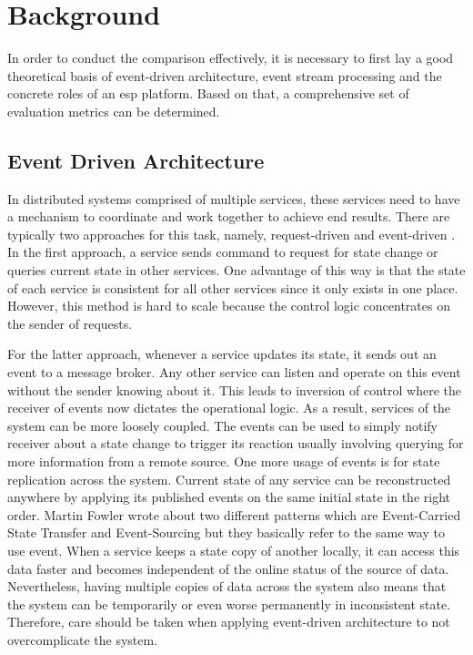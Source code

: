 \chapter{Background} \label{chap:background}
In order to conduct the comparison effectively, it is necessary to first lay a good theoretical basis of event-driven architecture, event stream processing and the concrete roles of an \acrlong{esp} platform. Based on that, a comprehensive set of evaluation metrics can be determined.
\section{Event Driven Architecture}
In distributed systems comprised of multiple services, these services need to have a mechanism to coordinate and work together to achieve end results. There are typically two approaches for this task, namely, request-driven and event-driven \cite{stopford2018designingeventdriven}. In the first approach, a service sends command to request for state change or queries current state in other services. One advantage of this way is that the state of each service is consistent for all other services since it only exists in one place. However, this method is hard to scale because the control logic concentrates on the sender of requests.

For the latter approach, whenever a service updates its state, it sends out an event to a message broker. Any other service can listen and operate on this event without the sender knowing about it. This leads to inversion of control where the receiver of events now dictates the operational logic. As a result, services of the system can be more loosely coupled. The events can be used to simply notify receiver about a state change to trigger its reaction usually involving querying for more information from a remote source. One more usage of events is for state replication across the system. Current state of any service can be reconstructed anywhere by applying its published events on the same initial state in the right order. Martin Fowler wrote about two different patterns which are Event-Carried State Transfer and Event-Sourcing \cite{martinfowlereventdriven} but they basically refer to the same way to use event. When a service keeps a state copy of another locally, it can access this data faster and becomes independent of the online status of the source of data. Nevertheless, having multiple copies of data across the system also means that the system can be temporarily or even worse permanently in inconsistent state. Therefore, care should be taken when applying event-driven architecture to not overcomplicate the system.

